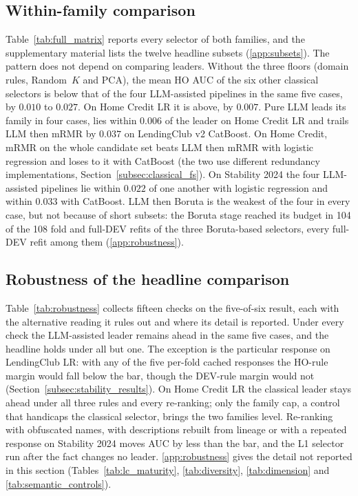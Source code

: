 \documentclass[final,5p,twocolumn]{elsarticle}
\newcommand{\Kfeat}{K}
\begin{document}
\subsection{Within-family comparison}
\label{subsec:within_family}

Table~\ref{tab:full_matrix} reports every selector of both families, and the supplementary material lists the twelve headline subsets (\ref{app:subsets}). The pattern does not depend on comparing leaders. Without the three floors (domain rules, Random~$\Kfeat$ and PCA), the mean HO AUC of the six other classical selectors is below that of the four LLM-assisted pipelines in the same five cases, by $0.010$ to $0.027$. On Home Credit LR it is above, by $0.007$. Pure LLM leads its family in four cases, lies within $0.006$ of the leader on Home Credit LR and trails LLM then mRMR by $0.037$ on LendingClub v2 CatBoost. On Home Credit, mRMR on the whole candidate set beats LLM then mRMR with logistic regression and loses to it with CatBoost (the two use different redundancy implementations, Section~\ref{subsec:classical_fs}). On Stability 2024 the four LLM-assisted pipelines lie within $0.022$ of one another with logistic regression and within $0.033$ with CatBoost. LLM then Boruta is the weakest of the four in every case, but not because of short subsets: the Boruta stage reached its budget in 104 of the 108 fold and full-DEV refits of the three Boruta-based selectors, every full-DEV refit among them (\ref{app:robustness}).

\subsection{Robustness of the headline comparison}
\label{subsec:robustness}

Table~\ref{tab:robustness} collects fifteen checks on the five-of-six result, each with the alternative reading it rules out and where its detail is reported. Under every check the LLM-assisted leader remains ahead in the same five cases, and the headline holds under all but one. The exception is the particular response on LendingClub LR: with any of the five per-fold cached responses the HO-rule margin would fall below the bar, though the DEV-rule margin would not (Section~\ref{subsec:stability_results}). On Home Credit LR the classical leader stays ahead under all three rules and every re-ranking; only the family cap, a control that handicaps the classical selector, brings the two families level. Re-ranking with obfuscated names, with descriptions rebuilt from lineage or with a repeated response on Stability 2024 moves AUC by less than the bar, and the L1 selector run after the fact changes no leader. \ref{app:robustness} gives the detail not reported in this section (Tables~\ref{tab:lc_maturity}, \ref{tab:diversity}, \ref{tab:dimension} and \ref{tab:semantic_controls}).
\end{document}
